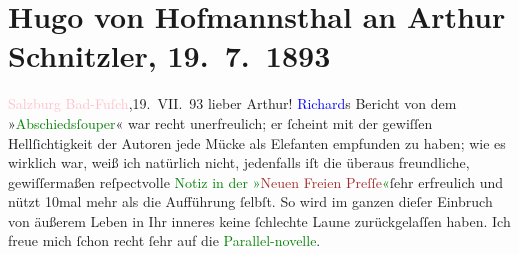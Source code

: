 

               \section[Hugo von Hofmannsthal an Arthur Schnitzler, 19. 7. 1893]{ Hugo von Hofmannsthal an Arthur Schnitzler, 19. 7. 1893}\nopagebreak{}\rehead{ }\normalsize\beginnumbering{} \toendnotes[C]{\smallbreak\pagebreak[2]} 
\toendnotes[C]{\smallbreak}\pstart
           {\pb}\textcolor{pink}{Salzburg Bad-Fuſch}{}\ledrightnote{\textcolor{pink}{Bad Fusch}},\hfill 19. VII. 93\pend
           \pstart{}lieber Arthur!\pend\pstart
           \textcolor{blue}{Richard}{}\ledrightnote{\textcolor{blue}{Richard Beer-Hofmann}}s Bericht von dem »\textcolor{green}{Abschiedsſouper}{}\ledrightnote{\textcolor{green}{Abschiedssouper}}« war recht unerfreulich; er ſcheint mit der
                    gewiſſen Hellſichtigkeit der Autoren jede Mücke als Elefanten empfunden zu
                    haben; wie es wirklich war, weiß ich natürlich nicht, jedenfalls iſt die überaus
                    freundliche, gewiſſermaßen reſpectvolle \textcolor{green}{Notiz in der »\textcolor{brown}{Neuen Freien
                            Preſſe}{}\ledrightnote{\textcolor{brown}{Neue Freie Presse}}«}{}ſehr erfreulich und nützt 10mal mehr als die
                    Aufführung ſelbſt. So wird im ganzen dieſer Einbruch von äußerem Leben in Ihr
                    inneres keine ſchlechte Laune zurückgelaſſen haben.\pend
           \pstart
           {\pb}Ich freue mich ſchon recht
                    ſehr auf die \textcolor{green}{Parallel-novelle}{}.\pend
